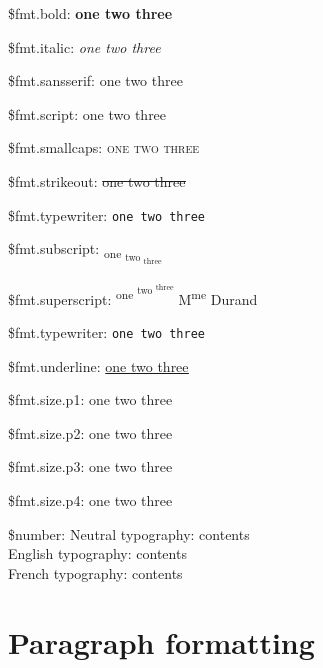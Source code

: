 \documentclass[demo]{pyscribe}
\newcommand\scripttext[1]{{\fontfamily{pzc}\selectfont\large#1}}
\begin{document}
\par\$fmt.bold:  \textbf{one
 \textbf{two
 \textbf{three}}}
\par\$fmt.italic:  \textit{one
 \textit{two
 \textit{three}}}
\par\$fmt.sansserif:  \textsf{one
 \textsf{two
 \textsf{three}}}
\par\$fmt.script:  \scripttext{one
 \scripttext{two
 \scripttext{three}}}
\par\$fmt.smallcaps:  \textsc{one
 \textsc{two
 \textsc{three}}}
\par\$fmt.strikeout:  \sout{one
 \sout{two
 \sout{three}}}
\par\$fmt.typewriter:  \texttt{one
 \texttt{two
 \texttt{three}}}
\par\$fmt.subscript:  \textsubscript{one
 \textsubscript{two
 \textsubscript{three}}}
\par\$fmt.superscript:  \textsuperscript{one
 \textsuperscript{two
 \textsuperscript{three}}} M\textsuperscript{me} Durand
\par\$fmt.typewriter:  \texttt{one
 \texttt{two
 \texttt{three}}}
\par\$fmt.underline:  \underline{one
 \underline{two
 \underline{three}}}
\par\$fmt.size.p1:  {\large one
 {\large two
 {\large three}}}
\par\$fmt.size.p2:  {\Large one
 {\Large two
 {\Large three}}}
\par\$fmt.size.p3:  {\LARGE one
 {\LARGE two
 {\LARGE three}}}
\par\$fmt.size.p4:  {\Huge one
 {\Huge two
 {\Huge three}}}

\par\$number: Neutral typography: contents \\
English typography: contents \\
French typography: contents \\

\section{Paragraph formatting}
\end{document}
